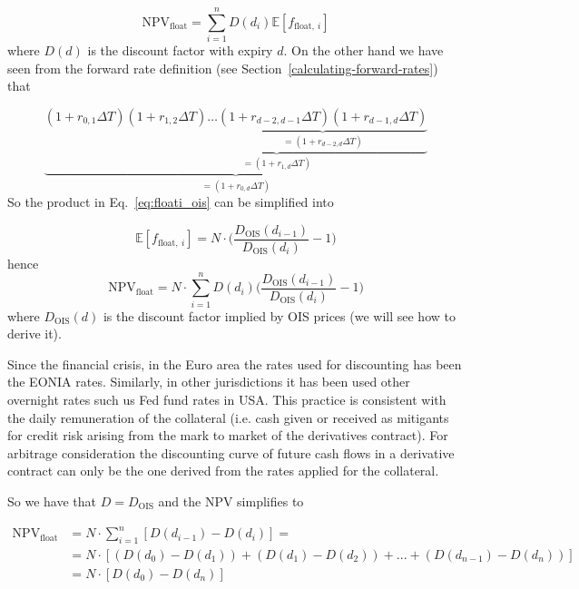 \begin{equation}
\mathrm{NPV}_{\mathrm{float}} = \sum_{i=1}^{n}D(d_i)\mathbb{E}[f_{\mathrm{float},~i}]
\end{equation}
where \(D(d)\) is the discount factor with expiry \(d\). On the other
hand we have seen from the forward rate definition (see Section~\ref{calculating-forward-rates}) that

\begin{equation}
\underbrace{(1+r_{0,1}\Delta T)\underbrace{(1+r_{1,2}\Delta T)\ldots\underbrace{(1+r_{d-2,d-1}\Delta T)(1+r_{d-1,d}\Delta T)}_{=(1+r_{d-2,d}\Delta T)}}_{=(1+r_{1,d}\Delta T)}}_{=(1+r_{0,d}\Delta T)}
\end{equation}
So the product in Eq.~\ref{eq:floati_ois} can be simplified into

\begin{equation}
\mathbb{E}[f_{\mathrm{float},~i}] = N\cdot\Big(\frac{D_{\mathrm{OIS}}(d_{i-1})}{D_{\mathrm{OIS}}(d_{i})} - 1\Big)
\end{equation}
hence
\begin{equation}
\mathrm{NPV}_{\mathrm{float}} = N\cdot \sum_{i=1}^{n}D(d_i) \Big(\frac{D_{\mathrm{OIS}}(d_{i-1})}{D_{\mathrm{OIS}}(d_{i})} - 1\Big)
\end{equation}
where \(D_{\mathrm{OIS}}(d)\) is the discount factor implied by OIS
prices (we will see how to derive it).

Since the financial crisis, in the Euro area the rates used for
discounting has been the EONIA rates. Similarly, in other jurisdictions
it has been used other overnight rates such us Fed fund rates in USA.
This practice is consistent with the daily remuneration of the
collateral (i.e. cash given or received as mitigants for credit risk
arising from the mark to market of the derivatives contract).
For arbitrage consideration the discounting curve of future cash flows
in a derivative contract can only be the one derived from the rates
applied for the collateral.

So we have that \(D = D_{\mathrm{OIS}}\) and the NPV simplifies to

\begin{equation}
  \begin{split}
    \mathrm{NPV}_{\mathrm{float}} & = N\cdot\sum_{i=1}^{n}[D(d_{i-1}) - D(d_i)] =  \\
    &= N\cdot[(D(d_{0}) - D(d_{1})) + (D(d_{1}) - D(d_{2})) + ... + (D(d_{n-1}) - D(d_{n}))]\\
    &= N \cdot [D(d_0) - D(d_n)]
  \end{split}
\end{equation}

